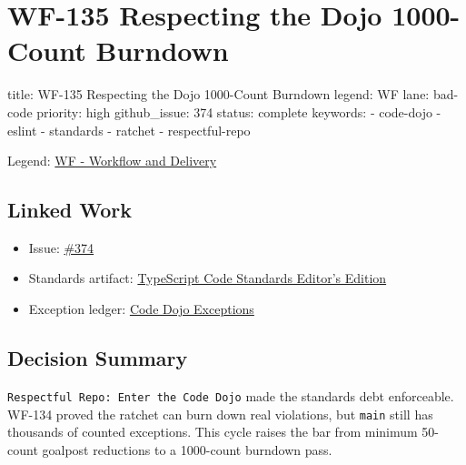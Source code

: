 \chapter{WF-135 Respecting the Dojo 1000-Count Burndown}\label{record-217}

\smallskip

\begin{RecordMeta}
title: WF-135 Respecting the Dojo 1000-Count Burndown
legend: WF
lane: bad-code
priority: high
github_issue: 374
status: complete
keywords:
  - code-dojo
  - eslint
  - standards
  - ratchet
  - respectful-repo

\end{RecordMeta}

Legend: \href{https://github.com/flyingrobots/bijou/blob/cbd70612140e7a450d764b3c7be1c6af878b99bc/docs/legends/WF-workflow-delivery.md}{WF - Workflow and Delivery}

\section{Linked Work}\label{record-217-linked-work}

\begin{itemize}
\tightlist
\item
  Issue: \href{https://github.com/flyingrobots/bijou/issues/374}{\#374}
\item
  Standards artifact: \href{https://github.com/flyingrobots/bijou/blob/cbd70612140e7a450d764b3c7be1c6af878b99bc/docs/typescript-code-standards.editors-edition.md}{TypeScript Code Standards Editor's Edition}
\item
  Exception ledger: \href{https://github.com/flyingrobots/bijou/blob/cbd70612140e7a450d764b3c7be1c6af878b99bc/docs/code-dojo-exceptions.md}{Code Dojo Exceptions}
\end{itemize}

\section{Decision Summary}\label{record-217-decision-summary}

\texttt{R\allowbreak{}e\allowbreak{}s\allowbreak{}p\allowbreak{}e\allowbreak{}c\allowbreak{}t\allowbreak{}f\allowbreak{}u\allowbreak{}l\allowbreak{} \allowbreak{}R\allowbreak{}e\allowbreak{}p\allowbreak{}o\allowbreak{}:\allowbreak{} \allowbreak{}E\allowbreak{}n\allowbreak{}t\allowbreak{}e\allowbreak{}r\allowbreak{} \allowbreak{}t\allowbreak{}h\allowbreak{}e\allowbreak{} \allowbreak{}C\allowbreak{}o\allowbreak{}d\allowbreak{}e\allowbreak{} \allowbreak{}D\allowbreak{}o\allowbreak{}j\allowbreak{}o} made the standards debt enforceable. WF-134 proved the ratchet can burn down real violations, but \texttt{m\allowbreak{}a\allowbreak{}i\allowbreak{}n} still has thousands of counted exceptions. This cycle raises the bar from minimum 50-count goalpost reductions to a 1000-count burndown pass.

